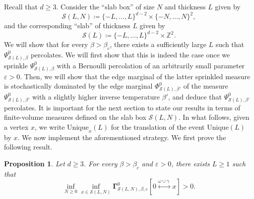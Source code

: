 \documentclass[11pt,a4paper]{article}
\newtheorem{proposition}[theorem]{Proposition}
\theoremstyle{definition}
\numberwithin{equation}{section}
\begin{document}
Recall that $d\geq 3$. Consider the ``slab box'' of size $N$ and thickness $L$ given by
\begin{equation}
    \mathcal{S}(L,N)\coloneqq \{-L,\ldots,L\}^{d-2}\times \{-N,\ldots,N\}^2,
\end{equation}
and the corresponding ``slab'' of thickness $L$ given by 
\begin{equation}
    \mathcal{S}(L)\coloneqq \{-L,\ldots,L\}^{d-2}\times \mathbb{Z}^2.
\end{equation}
We will show that for every $\beta>\beta_c$, there exists a sufficiently large $L$ such that $\Psi^0_{\mathcal{S}(L),\beta}$ percolates. We will first show that this is indeed the case once we sprinkle $\Psi^0_{\mathcal{S}(L),\beta}$ with a Bernoulli percolation of an arbitrarily small parameter $\varepsilon>0$. Then, we will show that the edge marginal of the latter sprinkled measure is stochastically dominated by the edge marginal $\Phi^0_{\mathcal{S}(L),\beta'}$ of the measure $\Psi^0_{\mathcal{S}(L),\beta'}$ with a slightly higher inverse temperature $\beta'$, and deduce that $\Psi^0_{\mathcal{S}(L),\beta'}$ percolates. It is important for the next section to state our results in terms of finite-volume measures defined on the slab box $\mathcal{S}(L,N)$. In what follows, given a vertex $x$, we write $\mathrm{Unique}_x(L)$ for the translation of the event $\mathrm{Unique}(L)$ by $x$. We now implement the aforementioned strategy. We first prove the following result. 

\begin{proposition}\label{prop: slab sprinkling}
Let $d\geq 3$. For every $\beta>\beta_c$ and $\varepsilon>0$, there exists $L\geq 1$ such that
\begin{equation*}
        \inf_{N\geq 0}\inf_{x\in \mathcal{S}(L,N)} \boldsymbol{\Gamma}^0_{\mathcal{S}(L,N),\beta,\varepsilon} [0\overset{\omega\cup \gamma\:}{\longleftrightarrow} x]>0.
\end{equation*}
\end{proposition}
\end{document}
